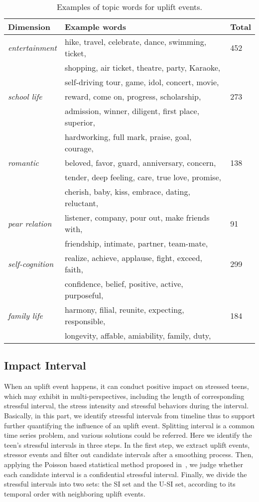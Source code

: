 \begin{table}
\centering
\caption{Examples of topic words for uplift events.}
\label{tab:keyWords}
\begin{tabular}{lll}
\toprule
Dimension & Example words & Total \\ \midrule
\emph{entertainment}  & hike, travel, celebrate, dance, swimming, ticket, & 452\\
& shopping, air ticket, theatre, party, Karaoke, & \\
& self-driving tour, game, idol, concert, movie, & \\
\emph{school life}       & reward, come on, progress, scholarship, & 273\\
				  & admission, winner, diligent, first place, superior, & \\
				  & hardworking, full mark,  praise, goal, courage, & \\
\emph{romantic}         &  beloved, favor, guard, anniversary,  concern,  & 138\\
				  & tender, deep feeling, care, true love, promise, & \\
				  & cherish, baby, kiss, embrace, dating, reluctant,&\\
\emph{pear relation}   & listener, company, pour out, make friends with, & 91\\
				 & friendship, intimate, partner, team-mate,&\\
\emph{self-cognition} & realize, achieve, applause, fight, exceed, faith, & 299\\
				 & confidence, belief, positive, active, purposeful, &\\
\emph{family life}       & harmony, filial, reunite, expecting, responsible, & 184\\
				& longevity, affable, amiability, family, duty, &\\
\bottomrule
\end{tabular}
\end{table}

\subsection{Impact Interval}
When an uplift event happens, it can conduct positive impact on stressed teens,
which may exhibit in multi-perspectives,
including the length of corresponding stressful interval, the stress intensity and stressful behaviors during the interval.
Basically, in this part, we identify stressful intervals from timeline thus to support further quantifying the influence of an uplift event.
Splitting interval is a common time series problem, and various solutions could be referred.
Here we identify the teen's stressful intervals in three steps.
In the first step, we extract uplift events, stressor events and filter out candidate intervals after a smoothing process.
Then, applying the Poisson based statistical method proposed in~\cite{Li2017Analyzing},
we judge whether each candidate interval is a confidential stressful interval.
Finally, we divide the stressful intervals into two sets: the SI set and the U-SI set,
according to its temporal order with neighboring uplift events.

